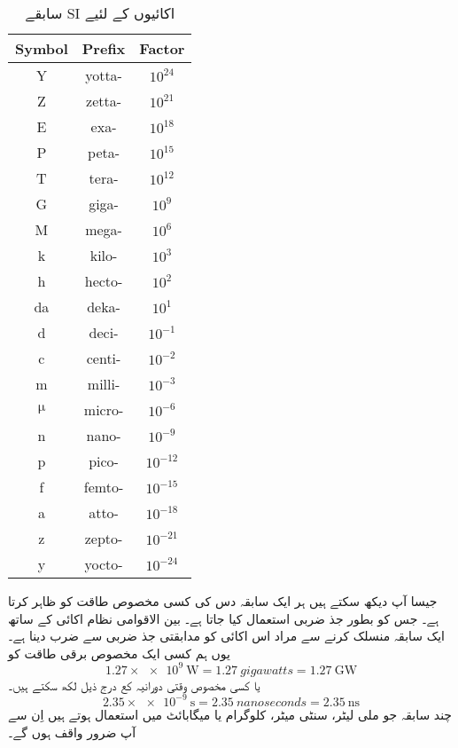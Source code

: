 \documentclass[leqno, b5paper]{khalid-urdu-book}
\begin{document}
	\begin{table}[h!]
		
		\centering
		\begin{tabular}{|c c c|} 
			\hline
			Symbol & Prefix & Factor\\
			\hline\hline
			Y & yotta- & $10^{24}$\\
			\hline
			Z & zetta- & $10^{21}$\\
			\hline
			E & exa- & $10^{18}$\\
			\hline
			P & peta- & $10^{15}$\\
			\hline
			T & tera- & $10^{12}$\\
			\hline
			G & giga- & $10^{9}$\\
			\hline
			M & mega- & $10^{6}$\\
			\hline
			k & kilo- & $10^{3}$\\
			\hline
			h & hecto- & $10^{2}$\\
			\hline
			da & deka- & $10^{1}$\\
			\hline
			d & deci- & $10^{-1}$\\
			\hline
			c & centi- & $10^{-2}$\\
			\hline
			m & milli- & $10^{-3}$\\
			\hline
			$\upmu$ & micro- & $10^{-6}$\\
			\hline
			n & nano- & $10^{-9}$\\
			\hline
			p & pico- & $10^{-12}$\\
			\hline
			f & femto- & $10^{-15}$\\
			\hline
			a & atto- & $10^{-18}$\\
			\hline
			z & zepto- & $10^{-21}$\\
			\hline
			y & yocto- & $10^{-24}$\\
			\hline
		\end{tabular}
		\caption{سابقے SI اکائیوں کے لئیے}
		\label{tab:my_label}
	\end{table}
	جیسا آپ دیکھ سکتے ہیں ہر ایک سابقہ دس کی کسی مخصوص طاقت کو ظاہر کرتا ہے۔ جس کو بطور جذ ضربی استعمال کیا جاتا ہے۔ بین الاقوامی نظام اکائی کے ساتھ ایک سابقہ منسلک کرنے سے مراد اس اکائی کو مدابقتی جذ ضربی سے ضرب دینا ہے۔ یوں ہم کسی ایک مخصوص برقی طاقت کو
	\begin{equation}
		\num{1.27}\times \SI{e9}{\watt} = \SI{1.27}{gigawatts} = \SI{1.27}{\giga\watt}
	\end{equation}
	یا کسی مخصوص وقتی دورانیہ کع درج ذیل لکھ سکتے ہیں۔
	\begin{equation}
		\num{2.35}\times \SI{e-9}{\second} = \SI{2.35}{nanoseconds} = \SI{2.35}{\nano\second}
	\end{equation}
	چند سابقہ جو ملی لیٹر، سنٹی میٹر، کلوگرام یا میگابائٹ میں استعمال ہوتے ہیں اِن سے آپ ضرور واقف ہوں گے۔
\end{document}
